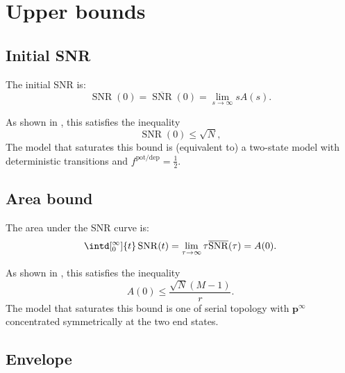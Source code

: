 \documentclass[12pt]{article}
\newcommand{\pr}{\mathbf{p}}
\newcommand{\eq}{\pr^\infty}
\newcommand{\potdep}{^{\text{pot/dep}}}
\DeclareMathOperator{\snr}{SNR}
\newcommand{\snrb}{\overline{\snr}}
\begin{document}
\section{Upper bounds}\label{sec:upperbnds}



\subsection{Initial SNR}\label{sec:initial}

The initial SNR is:
%
\begin{equation}\label{eq:initdef}
  \snr(0) = \snrb(0) = \lim_{s\to\infty} sA(s).
\end{equation}
%

As shown in \cite{Lahiri2013synapse}, this satisfies the inequality
%
\begin{equation}\label{eq:initbnd}
  \snr(0) \leq \sqrt{N},
\end{equation}
%
The model that saturates this bound is (equivalent to) a two-state model with deterministic transitions and $f\potdep=\frac{1}{2}$.

\subsection{Area bound}\label{sec:area}

The area under the SNR curve is:
%
\begin{equation}\label{eq:areadef}
  \intd[_0^\infty]{t} \snr(t) = \lim_{\tau\to\infty} \tau \snrb(\tau) = A(0).
\end{equation}
%

As shown in \cite{Lahiri2013synapse}, this satisfies the inequality
%
\begin{equation}\label{eq:areabnd}
  A(0) \leq \frac{\sqrt{N}(M-1)}{r}.
\end{equation}
%
The model that saturates this bound is one of serial topology with $\eq$ concentrated symmetrically at the two end states.



\subsection{Envelope}\label{sec:envelope}
\end{document}
